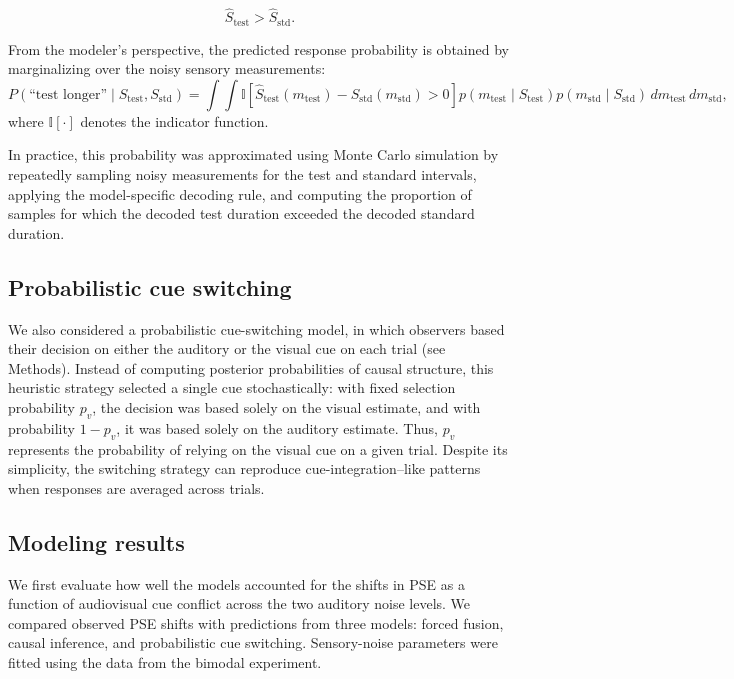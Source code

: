 \documentclass{jov}
\begin{document}
\begin{equation}
\hat S_{\mathrm{test}} > \hat S_{\mathrm{std}}.
\end{equation}

From the modeler's perspective, the predicted response probability is obtained by marginalizing over the noisy sensory measurements:
\begin{equation}
P(\text{``test longer''}\mid S_{\mathrm{test}},S_{\mathrm{std}})
=
\int \int
\mathbb{I}
\!\left[
\hat S_{\mathrm{test}}(m_{\mathrm{test}})
-
\hat S_{\mathrm{std}}(m_{\mathrm{std}})
>0
\right]
p(m_{\mathrm{test}}\mid S_{\mathrm{test}})
p(m_{\mathrm{std}}\mid S_{\mathrm{std}})
\,dm_{\mathrm{test}}\,dm_{\mathrm{std}},
\end{equation}
where $\mathbb{I}[\cdot]$ denotes the indicator function.

In practice, this probability was approximated using Monte Carlo simulation by repeatedly sampling noisy measurements for the test and standard intervals, applying the model-specific decoding rule, and computing the proportion of samples for which the decoded test duration exceeded the decoded standard duration.

\subsection{Probabilistic cue switching}
We also considered a probabilistic cue-switching model, in which observers based their decision on either the auditory or the visual cue on each trial (see Methods). Instead of computing posterior probabilities of causal structure, this heuristic strategy selected a single cue stochastically: with fixed selection probability $p_v$, the decision was based solely on the visual estimate, and with probability $1 - p_v$, it was based solely on the auditory estimate. Thus, $p_v$ represents the probability of relying on the visual cue on a given trial. Despite its simplicity, the switching strategy can reproduce cue-integration--like patterns when responses are averaged across trials.

\subsection{Modeling results}

We first evaluate how well the models accounted for the shifts in PSE as a function of audiovisual cue conflict across the two auditory noise levels. We compared observed PSE shifts with predictions from three models: forced fusion, causal inference, and probabilistic cue switching. Sensory-noise parameters were fitted using the data from the bimodal experiment. 
\end{document}
